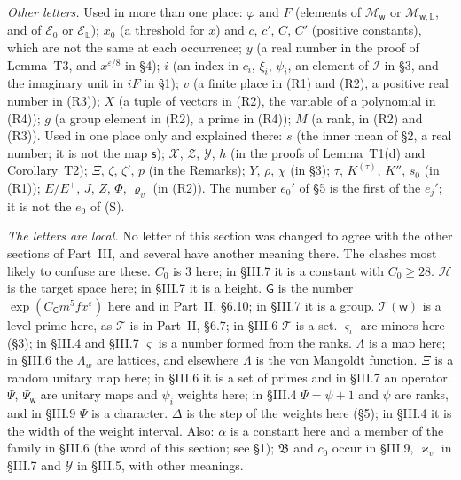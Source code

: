\documentclass[11pt,letterpaper]{article}
\begin{document}
{\sloppy \emph{Other letters.} Used in more than one place: $\varphi$ and $F$ (elements of
$\mathcal M_{\mathsf w}$ or $\mathcal M_{\mathsf w,\mathbb L}$, and of $\mathcal E_0$ or $\mathcal E_{\mathbb L}$);
$x_0$ (a threshold for $x$) and $c$, $c'$, $C$, $C'$ (positive constants), which are not the same at each
occurrence; $y$ (a real number in the proof of Lemma~T3, and $x^{\varepsilon/8}$ in \S4); $i$ (an index in
$c_i$, $\xi_i$, $\psi_i$, an element of $\mathcal I$ in \S3, and the imaginary unit in $iF$ in \S1); $v$ (a
finite place in (R1) and (R2), a positive real number in (R3)); $X$ (a tuple of vectors in (R2), the variable
of a polynomial in (R4)); $g$ (a group element in (R2), a prime in (R4)); $M$ (a rank, in (R2) and (R3)).
Used in one place only and explained there: $s$ (the inner mean of \S2, a real number; it is not the map
$\mathsf s$); $\mathcal X$, $\mathcal Z$, $\mathcal Y$, $h$ (in the proofs of Lemma~T1(d) and Corollary~T2);
$\Xi$, $\zeta$, $\zeta'$, $p$ (in the Remarks); $Y$, $\rho$, $\chi$ (in \S3); $\tau$, $K^{(\tau)}$, $K''$, $s_0$
(in (R1)); $E/E^+$, $J$, $Z$, $\Phi$, $\varrho_v$ (in (R2)). The number $e_0'$ of \S5 is the first of the
$e_j'$; it is not the $e_0$ of (S).\par}

{\sloppy \emph{The letters are local.} No letter of this section was changed to agree with the other sections of
Part~III, and several have another meaning there. The clashes most likely to confuse are these. $C_0$ is $3$
here; in \S III.7 it is a constant with $C_0\ge28$. $\mathcal H$ is the target space here; in \S III.7 it is a
height. $\mathsf G$ is the number $\exp(C_{\mathsf G}m^5fx^\varepsilon)$ here and in Part~II, \S6.10; in
\S III.7 it is a group. $\mathcal T(\mathsf w)$ is a level prime here, as $\mathcal T$ is in Part~II, \S6.7; in
\S III.6 $\mathcal T$ is a set. $\varsigma_\iota$ are minors here (\S3); in \S III.4 and \S III.7
$\varsigma$ is a number formed from the ranks. $\Lambda$ is a map here; in \S III.6 the $\Lambda_w$ are
lattices, and elsewhere $\Lambda$ is the von Mangoldt function. $\Xi$ is a random unitary map here; in
\S III.6 it is a set of primes and in \S III.7 an operator. $\Psi$, $\Psi_{\mathsf w}$ are unitary maps and
$\psi_i$ weights here; in \S III.4 $\Psi=\psi+1$ and $\psi$ are ranks, and in \S III.9 $\Psi$ is a character.
$\Delta$ is the step of the weights here (\S5); in \S III.4 it is the width of the weight interval. Also:
$\alpha$ is a constant here and a member of the family in \S III.6 (the word of this section; see \S1);
$\mathfrak B$ and $c_0$ occur in \S III.9, $\varkappa_v$ in \S III.7 and $\mathcal Y$ in \S III.5, with other
meanings.\par}
\end{document}
